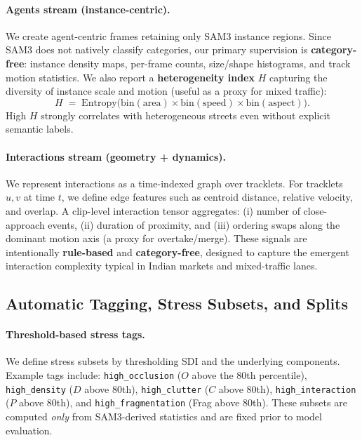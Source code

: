 \paragraph{Agents stream (instance-centric).}
We create agent-centric frames retaining only SAM3 instance regions. Since SAM3 does not natively classify categories, our primary supervision is \textbf{category-free}: instance density maps, per-frame counts, size/shape histograms, and track motion statistics. We also report a \textbf{heterogeneity index} $H$ capturing the diversity of instance scale and motion (useful as a proxy for mixed traffic):
\begin{equation}
\label{eq:heterogeneity}
H \;=\; \mathrm{Entropy}\big(\mathrm{bin}(\mathrm{area}) \times \mathrm{bin}(\mathrm{speed}) \times \mathrm{bin}(\mathrm{aspect})\big).
\end{equation}
High $H$ strongly correlates with heterogeneous streets even without explicit semantic labels.

\paragraph{Interactions stream (geometry + dynamics).}
We represent interactions as a time-indexed graph over tracklets. For tracklets $u,v$ at time $t$, we define edge features such as centroid distance, relative velocity, and overlap. A clip-level interaction tensor aggregates: (i) number of close-approach events, (ii) duration of proximity, and (iii) ordering swaps along the dominant motion axis (a proxy for overtake/merge). These signals are intentionally \textbf{rule-based} and \textbf{category-free}, designed to capture the emergent interaction complexity typical in Indian markets and mixed-traffic lanes.

\subsection{Automatic Tagging, Stress Subsets, and Splits}
\label{sec:indiasuburb5k_splits}

\paragraph{Threshold-based stress tags.}
We define stress subsets by thresholding SDI and the underlying components. Example tags include: \texttt{high\_occlusion} ($O$ above the 80th percentile), \texttt{high\_density} ($D$ above 80th), \texttt{high\_clutter} ($C$ above 80th), \texttt{high\_interaction} ($P$ above 80th), and \texttt{high\_fragmentation} (Frag above 80th). These subsets are computed \emph{only} from SAM3-derived statistics and are fixed prior to model evaluation.

